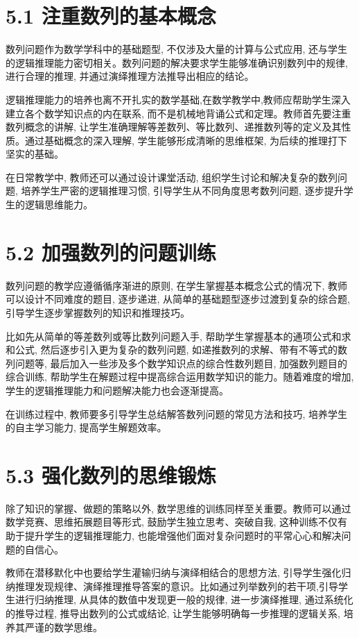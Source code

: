 \documentclass[10pt]{article}
\begin{document}
\section*{5.1 注重数列的基本概念}

数列问题作为数学学科中的基础题型, 不仅涉及大量的计算与公式应用, 还与学生的逻辑推理能力密切相关。数列问题的解决要求学生能够准确识别数列中的规律, 进行合理的推理, 并通过演绎推理方法推导出相应的结论。

逻辑推理能力的培养也离不开扎实的数学基础,在数学教学中,教师应帮助学生深入建立各个数学知识点的内在联系, 而不是机械地背诵公式和定理。教师首先要注重数列概念的讲解, 让学生准确理解等差数列、等比数列、递推数列等的定义及其性质。通过基础概念的深入理解, 学生能够形成清晰的思维框架, 为后续的推理打下坚实的基础。

在日常教学中, 教师还可以通过设计课堂活动, 组织学生讨论和解决复杂的数列问题, 培养学生严密的逻辑推理习惯, 引导学生从不同角度思考数列问题, 逐步提升学生的逻辑思维能力。

\section*{5.2 加强数列的问题训练}

数列问题的教学应遵循循序渐进的原则, 在学生掌握基本概念公式的情况下, 教师可以设计不同难度的题目, 逐步递进, 从简单的基础题型逐步过渡到复杂的综合题, 引导学生逐步掌握数列的知识和推理技巧。

比如先从简单的等差数列或等比数列问题入手, 帮助学生掌握基本的通项公式和求和公式, 然后逐步引入更为复杂的数列问题, 如递推数列的求解、带有不等式的数列问题等, 最后加入一些涉及多个数学知识点的综合性数列题目, 加强数列题目的综合训练, 帮助学生在解题过程中提高综合运用数学知识的能力。随着难度的增加, 学生的逻辑推理能力和问题解决能力也会逐渐提高。

在训练过程中, 教师要多引导学生总结解答数列问题的常见方法和技巧, 培养学生的自主学习能力, 提高学生解题效率。

\section*{5.3 强化数列的思维锻炼}

除了知识的掌握、做题的策略以外, 数学思维的训练同样至关重要。教师可以通过数学竞赛、思维拓展题目等形式, 鼓励学生独立思考、突破自我, 这种训练不仅有助于提升学生的逻辑推理能力, 也能增强他们面对复杂问题时的平常心心和解决问题的自信心。

教师在潜移默化中也要给学生灌输归纳与演绎相结合的思想方法, 引导学生强化归纳推理发现规律、演绎推理推导答案的意识。比如通过列举数列的若干项,引导学生进行归纳推理, 从具体的数值中发现更一般的规律, 进一步演绎推理, 通过系统化的推导过程, 推导出数列的公式或结论, 让学生能够明确每一步推理的逻辑关系, 培养其严谨的数学思维。
\end{document}
